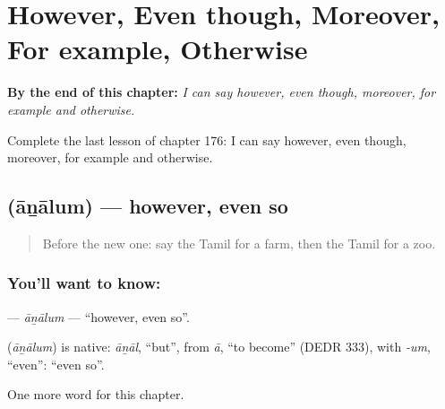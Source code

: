 
\chapter{However, Even though, Moreover, For example, Otherwise}
\label{ch:ta-however-even-though-moreover-for-example-otherwise}

\begin{chapteropening}
\textbf{By the end of this chapter:} \emph{I can say however, even though, moreover, for example and otherwise.}

Complete the last lesson of chapter 176: I can say however, even though, moreover, for example and otherwise.
\end{chapteropening}

\section[\texorpdfstring{\ta{ஆனாலும்} (āṉālum)}{ஆனாலும் (āṉālum)}]{ (āṉālum) — however, even so}

\label{lesson:TA-C176-analum}



\begin{quote}
Before the new one: say the Tamil for a farm, then the Tamil for a zoo.
\end{quote}

\subsection*{You'll want to know: }
\textbf{} — \emph{āṉālum} — \textquotedblleft{}however, even so\textquotedblright{}.

\begin{cousinweb}
\textbf{} (\emph{āṉālum}) is native: \emph{āṉāl}, \textquotedblleft{}but\textquotedblright{}, from \emph{ā}, \textquotedblleft{}to become\textquotedblright{} (DEDR 333), with \emph{-um}, \textquotedblleft{}even\textquotedblright{}: \textquotedblleft{}even so\textquotedblright{}.
\end{cousinweb}

\begin{grammarlens}[title={What you've built}]
One more word for this chapter.
\end{grammarlens}

